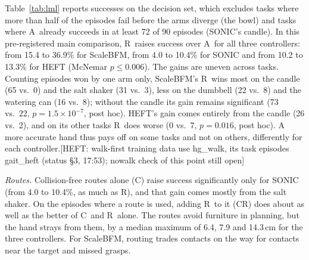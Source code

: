 \documentclass[conference]{IEEEtran}
\newif\ifdraft \drafttrue
\newcommand{\dnote}[1]{\ifdraft{\color{red}\footnotesize[#1]}\fi}
\newcommand{\Ad}{\textsc{A}}   %
\newcommand{\Rr}{\textsc{R}}   %
\newcommand{\Croute}{\textsc{C}}   %
\newcommand{\CRr}{\textsc{CR}}   %
\begin{document}
Table~\ref{tab:lml} reports successes on the decision set, which excludes tasks where more than half of the episodes fail before the arms diverge (the bowl) and tasks where \Ad\ already succeeds in at least 72 of 90 episodes (SONIC's candle). In this pre-registered main comparison, \Rr\ raises success over \Ad\ for all three controllers: from 15.4 to 36.9\% for ScaleBFM, from 4.0 to 10.4\% for SONIC and from 10.2 to 13.3\% for HEFT (McNemar $p\le0.006$). The gains are uneven across tasks. Counting episodes won by one arm only, ScaleBFM's \Rr\ wins most on the candle (65 vs.\ 0) and the salt shaker (31 vs.\ 3), less on the dumbbell (22 vs.\ 8) and the watering can (16 vs.\ 8); without the candle its gain remains significant (73 vs.\ 22, $p=1.5\times10^{-7}$, post hoc). HEFT's gain comes entirely from the candle (26 vs.\ 2), and on its other tasks \Rr\ does worse (0 vs.\ 7, $p=0.016$, post hoc). A more accurate hand thus pays off on some tasks and not on others, differently for each controller.\dnote{HEFT: walk-first training data use hg\_walk, its task episodes gait\_heft (status §3, 17:53); nowalk check of this point still open}

\emph{Routes.} Collision-free routes alone (\Croute) raise success significantly only for SONIC (from 4.0 to 10.4\%, as much as \Rr), and that gain comes mostly from the salt shaker. On the episodes where a route is used, adding \Rr\ to it (\CRr) does about as well as the better of \Croute\ and \Rr\ alone. The routes avoid furniture in planning, but the hand strays from them, by a median maximum of 6.4, 7.9 and 14.3\,cm for the three controllers. For ScaleBFM, routing trades contacts on the way for contacts near the target and missed grasps.
\end{document}
